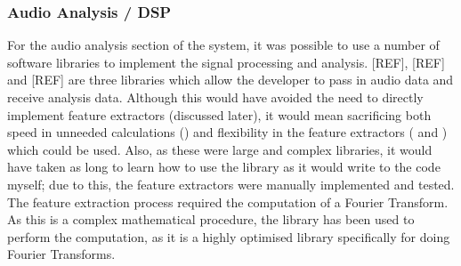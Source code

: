 \subsubsection{Audio Analysis / DSP}
For the audio analysis section of the system, it was possible to use a number of software libraries to implement the signal processing and analysis. [REF], [REF] and [REF] are three libraries which allow the developer to pass in audio data and receive analysis data. Although this would have avoided the need to directly implement feature extractors (discussed later), it would mean sacrificing both speed in unneeded calculations () and flexibility in the feature extractors ( and ) which could be used. Also, as these were large and complex libraries, it would have taken as long to learn how to use the library as it would write to the code myself; due to this, the feature extractors were manually implemented and tested.
The feature extraction process required the computation of a Fourier Transform. As this is a complex mathematical procedure, the   library has been used to perform the computation, as it is a highly optimised library specifically for doing Fourier Transforms.
